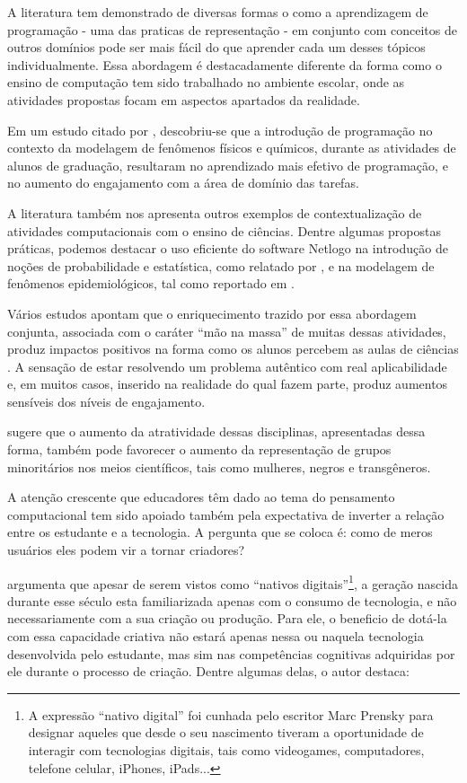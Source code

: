 A literatura tem demonstrado de diversas formas o como a aprendizagem de programação - uma das praticas de representação - em conjunto com conceitos de outros domínios pode ser mais fácil do que aprender cada um desses tópicos individualmente. Essa abordagem é destacadamente diferente da forma como o ensino de computação tem sido trabalhado no ambiente escolar, onde as atividades propostas focam em aspectos apartados da realidade.

Em um estudo citado por , descobriu-se que a introdução de programação no contexto da modelagem de fenômenos físicos e químicos, durante as atividades de alunos de graduação, resultaram no aprendizado mais efetivo de programação, e no aumento do engajamento com a área de domínio das tarefas.

A literatura também nos apresenta outros exemplos de contextualização de atividades computacionais com o ensino de ciências. Dentre algumas propostas práticas, podemos destacar o uso eficiente do software Netlogo \cite{netlogo} na introdução de noções de probabilidade e estatística, como relatado por , e na modelagem de fenômenos epidemiológicos, tal como reportado em \cite{Lee2011}.

Vários estudos apontam que o enriquecimento trazido por essa abordagem conjunta, associada com o caráter ``mão na massa'' de muitas dessas atividades, produz impactos positivos na forma como os alunos percebem as aulas de ciências \cite{Lee2011, Barr2011}. A sensação de estar resolvendo um problema autêntico com real aplicabilidade e, em muitos casos, inserido na realidade do qual fazem parte, produz aumentos sensíveis dos níveis de engajamento.

 sugere que o aumento da atratividade dessas disciplinas, apresentadas dessa forma, também pode favorecer o aumento da representação de grupos minoritários nos meios científicos, tais como mulheres, negros e transgêneros.

A atenção crescente que educadores têm dado ao tema do pensamento computacional tem sido apoiado também pela expectativa de inverter a relação entre os estudante e a tecnologia. A pergunta que se coloca é: como de meros usuários eles podem vir a tornar criadores? 

 argumenta que apesar de serem vistos como ``nativos digitais''\footnote{A expressão ``nativo digital'' foi cunhada pelo escritor Marc Prensky para designar aqueles que desde o seu nascimento tiveram a oportunidade de interagir com tecnologias digitais, tais como videogames, computadores, telefone celular, iPhones, iPads...},  a geração nascida durante esse século esta familiarizada apenas com o consumo de tecnologia, e não necessariamente com a sua criação ou produção. Para ele, o beneficio de dotá-la com essa capacidade criativa não estará apenas nessa ou naquela tecnologia desenvolvida pelo estudante, mas sim nas competências cognitivas adquiridas por ele durante o processo de criação. Dentre algumas delas, o autor destaca:

